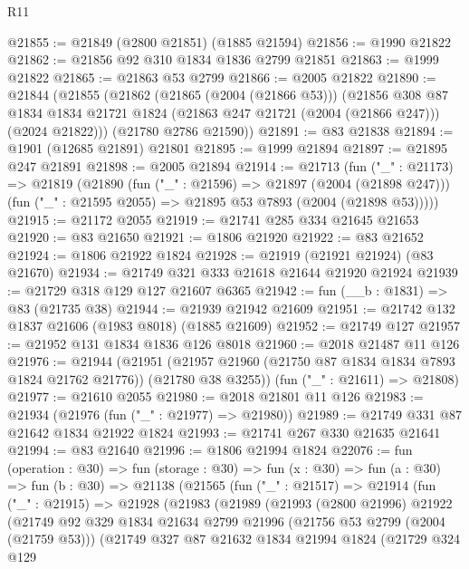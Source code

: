 \begin{lexlean}{R11}
\begin{coremodule}
@21855 := @21849 (@2800 @21851) (@1885 @21594)
@21856 := @1990 @21822
@21862 := @21856 @92 @310 @1834 @1836 @2799 @21851
@21863 := @1999 @21822
@21865 := @21863 @53 @2799
@21866 := @2005 @21822
@21890 := @21844
    (@21855
      (@21862
        (@21865 (@2004 (@21866 @53)))
        (@21856
          @308
          @87
          @1834
          @1834
          @21721
          @1824
          (@21863 @247 @21721 (@2004 (@21866 @247)))
          (@2024 @21822)))
      (@21780 @2786 @21590))
@21891 := @83 @21838
@21894 := @1901 (@12685 @21891) @21801
@21895 := @1999 @21894
@21897 := @21895 @247 @21891
@21898 := @2005 @21894
@21914 := @21713
    (fun ("_" : @21173) =>
    @21819
      (@21890
        (fun ("_" : @21596) => @21897 (@2004 (@21898 @247)))
        (fun ("_" : @21595 @2055) => @21895 @53 @7893 (@2004 (@21898 @53)))))
@21915 := @21172 @2055
@21919 := @21741 @285 @334 @21645 @21653
@21920 := @83 @21650
@21921 := @1806 @21920
@21922 := @83 @21652
@21924 := @1806 @21922 @1824
@21928 := @21919 (@21921 @21924) (@83 @21670)
@21934 := @21749 @321 @333 @21618 @21644 @21920 @21924
@21939 := @21729 @318 @129 @127 @21607 @6365
@21942 := fun (__b : @1831) => @83 (@21735 @38)
@21944 := @21939 @21942 @21609
@21951 := @21742 @132 @1837 @21606 (@1983 @8018) (@1885 @21609)
@21952 := @21749 @127
@21957 := @21952 @131 @1834 @1836 @126 @8018
@21960 := @2018 @21487 @11 @126
@21976 := @21944
    (@21951 (@21957 @21960 (@21750 @87 @1834 @1834 @7893 @1824 @21762 @21776)) (@21780 @38 @3255))
    (fun ("_" : @21611) => @21808)
@21977 := @21610 @2055
@21980 := @2018 @21801 @11 @126
@21983 := @21934 (@21976 (fun ("_" : @21977) => @21980))
@21989 := @21749 @331 @87 @21642 @1834 @21922 @1824
@21993 := @21741 @267 @330 @21635 @21641
@21994 := @83 @21640
@21996 := @1806 @21994 @1824
@22076 := fun (operation : @30) =>
  fun (storage : @30) =>
  fun (x : @30) =>
  fun (a : @30) =>
  fun (b : @30) =>
  @21138
    (@21565
      (fun ("_" : @21517) =>
      @21914
        (fun ("_" : @21915) =>
        @21928
          (@21983
            (@21989
              (@21993
                (@2800 @21996)
                @21922
                (@21749
                  @92
                  @329
                  @1834
                  @21634
                  @2799
                  @21996
                  (@21756 @53 @2799 (@2004 (@21759 @53)))
                  (@21749
                    @327
                    @87
                    @21632
                    @1834
                    @21994
                    @1824
                    (@21729
                      @324
                      @129

\end{coremodule}
\end{lexlean}
